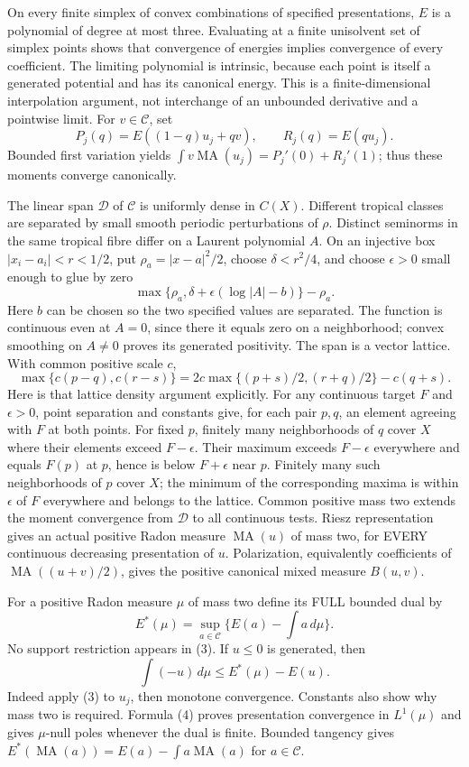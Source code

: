 \documentclass[11pt]{article}
\newcommand{\C}{\mathcal C}
\newcommand{\MA}{\operatorname{MA}}
\begin{document}
On every finite simplex of convex combinations of specified presentations,
$E$ is a polynomial of degree at most three. Evaluating at a finite unisolvent
set of simplex points shows that convergence of energies implies convergence
of every coefficient. The limiting polynomial is intrinsic, because each
point is itself a generated potential and has its canonical energy.
This is a finite-dimensional interpolation argument, not interchange of an
unbounded derivative and a pointwise limit.
For $v\in\C$, set
\[
 P_j(q)=E((1-q)u_j+qv),\qquad R_j(q)=E(qu_j).
\]
Bounded first variation yields
$\int v\MA(u_j)=P_j'(0)+R_j'(1)$; thus these moments converge canonically.

The linear span $\mathcal D$ of $\C$ is uniformly dense in $C(X)$.
Different tropical classes are separated by small smooth periodic perturbations
of $\rho$. Distinct seminorms in the same tropical fibre differ on a Laurent
polynomial $A$. On an injective box $|x_i-a_i|<r<1/2$, put
$\rho_a=|x-a|^2/2$, choose $\delta<r^2/4$, and choose $\epsilon>0$
small enough to glue by zero
\[
 \max\{\rho_a,\delta+\epsilon(\log|A|-b)\}-\rho_a.              \tag{2}
\]
Here $b$ can be chosen so the two specified values are separated. The function
is continuous even at $A=0$, since there it equals zero on a neighborhood;
convex smoothing on $A\ne0$ proves its generated positivity.
The span is a vector lattice. With common positive scale $c$,
\[
 \max\{c(p-q),c(r-s)\}
 =2c\max\{(p+s)/2,(r+q)/2\}-c(q+s).
\]
Here is that lattice density argument explicitly. For any continuous target
$F$ and $\epsilon>0$, point separation and constants give, for each pair
$p,q$, an element agreeing with $F$ at both points. For fixed $p$, finitely
many neighborhoods of $q$ cover $X$ where their elements exceed
$F-\epsilon$. Their maximum exceeds $F-\epsilon$ everywhere and equals
$F(p)$ at $p$, hence is below $F+\epsilon$ near $p$. Finitely many such
neighborhoods of $p$ cover $X$; the minimum of the corresponding maxima
is within $\epsilon$ of $F$ everywhere and belongs to the lattice. Common positive mass two extends the moment convergence
from $\mathcal D$ to all continuous tests. Riesz representation gives an
actual positive Radon measure $\MA(u)$ of mass two, for EVERY continuous
decreasing presentation of $u$. Polarization, equivalently coefficients of
$\MA((u+v)/2)$, gives the positive canonical mixed measure $B(u,v)$.

For a positive Radon measure $\mu$ of mass two define its FULL bounded dual by
\[
 E^*(\mu)=\sup_{a\in\C}\{E(a)-\int a\,d\mu\}.               \tag{3}
\]
No support restriction appears in (3). If $u\le0$ is generated, then
\[
 \int(-u)\,d\mu\le E^*(\mu)-E(u).                          \tag{4}
\]
Indeed apply (3) to $u_j$, then monotone convergence. Constants also show why
mass two is required. Formula (4) proves presentation convergence in
$L^1(\mu)$ and gives $\mu$-null poles whenever the dual is finite.
Bounded tangency gives
$E^*(\MA(a))=E(a)-\int a\MA(a)$ for $a\in\C$.
\end{document}

